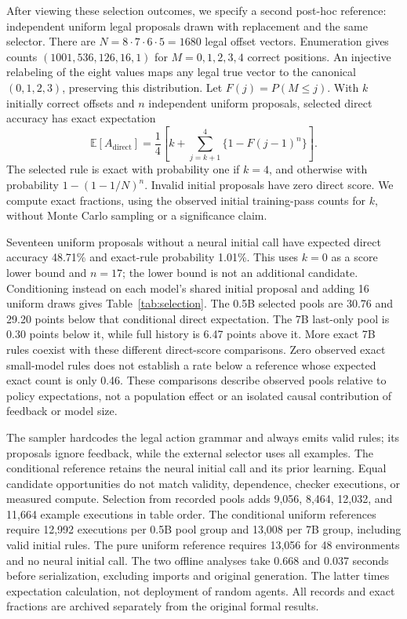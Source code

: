 \documentclass[11pt]{article}
\begin{document}
After viewing these selection outcomes, we specify a second post-hoc
reference: independent uniform legal proposals drawn with replacement and
the same selector. There are $N=8\cdot7\cdot6\cdot5=1680$ legal offset vectors.
Enumeration gives counts $(1001,536,126,16,1)$ for $M=0,1,2,3,4$ correct
positions. An injective relabeling of the eight values maps any legal true
vector to the canonical $(0,1,2,3)$, preserving this distribution. Let
$F(j)=P(M\leq j)$. With $k$ initially correct offsets and $n$ independent
uniform proposals, selected direct accuracy has exact expectation
\[
 \mathbb{E}[A_{\mathrm{direct}}]
 =\frac{1}{4}\left[k+\sum_{j=k+1}^{4}\{1-F(j-1)^n\}\right].
\]
The selected rule is exact with probability one if $k=4$, and otherwise with
probability $1-(1-1/N)^n$. Invalid initial proposals have zero direct score.
We compute exact fractions, using the observed initial training-pass counts
for $k$, without Monte Carlo sampling or a significance claim.

Seventeen uniform proposals without a neural initial call have expected
direct accuracy 48.71\% and exact-rule probability 1.01\%. This uses $k=0$
as a score lower bound and $n=17$; the lower bound is not an additional
candidate. Conditioning instead on each model's shared initial proposal and
adding 16 uniform draws gives Table~\ref{tab:selection}. The 0.5B selected
pools are 30.76 and 29.20 points below that conditional direct expectation.
The 7B last-only pool is 0.30 points below it, while full history is 6.47
points above it. More exact 7B rules coexist with these different direct-score
comparisons. Zero observed exact small-model rules does not establish a rate
below a reference whose expected exact count is only 0.46. These comparisons
describe observed pools relative to policy expectations, not a population
effect or an isolated causal contribution of feedback or model size.

The sampler hardcodes the legal action grammar and always emits valid rules;
its proposals ignore feedback, while the external selector uses all examples.
The conditional reference retains the neural initial call and its prior
learning. Equal candidate opportunities do not match validity, dependence,
checker executions, or measured compute. Selection from recorded pools adds
9,056, 8,464, 12,032, and 11,664 example executions in table order. The
conditional uniform references require 12,992 executions per 0.5B pool group
and 13,008 per 7B group, including valid initial rules. The pure uniform
reference requires 13,056 for 48 environments and no neural initial call.
The two offline analyses take 0.668 and 0.037 seconds before serialization,
excluding imports and original generation. The latter times expectation
calculation, not deployment of random agents. All records and exact fractions
are archived separately from the original formal results.
\end{document}
